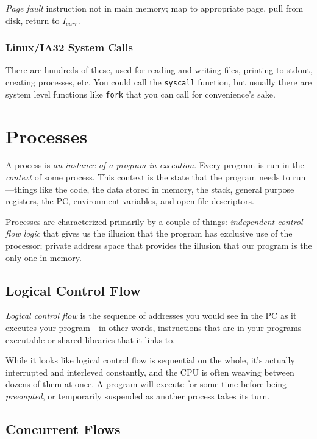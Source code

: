 \documentclass[fleqn]{article}
\begin{document}
\textit{Page fault} instruction not in main memory; map to appropriate page, pull from disk, return to $I_{curr}$.

\subsubsection*{Linux/IA32 System Calls}

There are hundreds of these, used for reading and writing files, printing to stdout, creating processes, etc. You could call the \texttt{syscall} function, but usually there are system level functions like \texttt{fork} that you can call for convenience's sake.

\section{Processes}

A process is \textit{an instance of a program in execution}. Every program is run in the \textit{context} of some process. This context is the state that the program needs to run---things like the code, the data stored in memory, the stack, general purpose registers, the PC, environment variables, and open file descriptors.

Processes are characterized primarily by a couple of things: \textit{independent control flow logic} that gives us the illusion that the program has exclusive use of the processor; private address space that provides the illusion that our program is the only one in memory.

\subsection{Logical Control Flow}

\textit{Logical control flow} is the sequence of addresses you would see in the PC as it executes your program---in other words, instructions that are in your programs executable or shared libraries that it links to.

While it looks like logical control flow is sequential on the whole, it's actually interrupted and interleved constantly, and the CPU is often weaving between dozens of them at once. A program will execute for some time before being \textit{preempted}, or temporarily suspended as another process takes its turn.

\subsection{Concurrent Flows}
\end{document}
